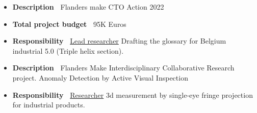 \documentclass{resume}
\begin{document}
\begin{itemize}[parsep=0.5ex]
  \item \textbf{Description~} Flanders make CTO Action 2022
  \item \textbf{Total project budget~} \SLASH95K Euros
  \item \textbf{Responsibility~} \underline{Lead researcher} Drafting the glossary for Belgium industrial 5.0 (Triple helix section).
\end{itemize}

\label{ADAVI}
\begin{itemize}[parsep=0.5ex]
  \item \textbf{Description~} Flanders Make Interdisciplinary Collaborative Research project. Anomaly Detection by Active Visual Inspection
  \item \textbf{Responsibility~} \underline{Researcher} 3d measurement by single-eye fringe projection for industrial products.
\end{itemize}


\end{document}
